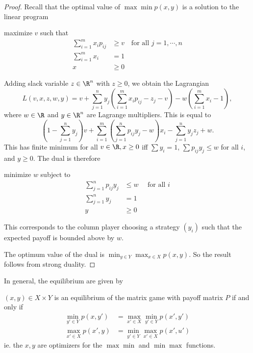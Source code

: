 \documentclass[a4paper]{article}
\begin{document}
\begin{proof}
  Recall that the optimal value of $\max\min p(x, y)$ is a solution to the linear program
  \begin{center}
    maximize $v$ such that
    \begin{align*}
      \sum_{i = 1}^m x_i p_{ij} &\geq v\quad\text{for all }j = 1, \cdots, n\\
      \sum_{i = 1}^m x_i &= 1\\
      x &\geq 0
    \end{align*}
  \end{center}
  Adding slack variable $z\in \R^n$ with $z \geq 0$, we obtain the Lagrangian
  \[
    L(v, x, z, w, y) = v + \sum_{j = 1}^n y_j\left(\sum_{i = 1}^m x_ip_{ij} - z_j - v\right) - w\left(\sum_{i = 1}^m x_i - 1\right),
  \]
  where $w\in \R$ and $y\in \R^n$ are Lagrange multipliers. This is equal to
  \[
    \left(1 - \sum_{j = 1}^n y_j\right)v + \sum_{i = 1}^m \left(\sum_{j = 1}^n p_{ij}y_j - w\right)x_i- \sum_{j = 1}^n y_j z_j + w.
  \]
  This has finite minimum for all $v\in \R, x \geq 0$ iff $\sum y_i = 1$, $\sum p_{ij}y_j \leq w$ for all $i$, and $y \geq 0$. The dual is therefore
  \begin{center}
    minimize $w$ subject to
    \begin{align*}
      \sum_{j = 1}^n p_{ij}y_j &\leq w\quad\text{ for all }i\\
      \sum_{j = 1}^n {y_j} &= 1\\
      y &\geq 0
    \end{align*}
  \end{center}
  This corresponds to the column player choosing a strategy $(y_i)$ such that the expected payoff is bounded above by $w$.

  The optimum value of the dual is $\displaystyle\min_{y\in Y}\max_{x\in X}p(x, y)$. So the result follows from strong duality.
\end{proof}

In general, the equilibrium are given by
\begin{thm}
  $(x, y)\in X\times Y$ is an equilibrium of the matrix game with payoff matrix $P$ if and only if
  \begin{align*}
    \min_{y'\in Y} p(x, y') &= \max_{x' \in X}\min_{y'\in Y} p(x', y')\\
    \max_{x'\in X} p(x', y) &= \min_{y' \in Y}\max_{x'\in X} p(x', u')
  \end{align*}
  ie. the $x, y$ are optimizers for the $\max\min$ and $\min\max$ functions.
\end{thm}
\end{document}
